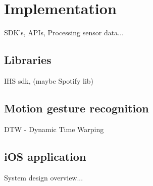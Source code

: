 \chapter{Implementation}
SDK's, APIs, Processing sensor data...


\section{Libraries}
IHS sdk, (maybe Spotify lib)


\section{Motion gesture recognition}
 DTW - Dynamic Time Warping 


\section{iOS application}
System design overview...



